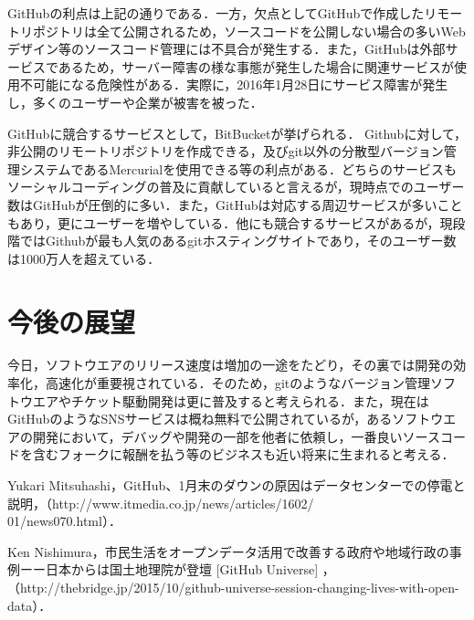 \documentclass[a4paper,9pt,twocolumn]{jsarticle}
\begin{document}
GitHubの利点は上記の通りである．一方，欠点としてGitHubで作成したリモートリポジトリは全て公開されるため，ソースコードを公開しない場合の多いWebデザイン等のソースコード管理には不具合が発生する．また，GitHubは外部サービスであるため，サーバー障害の様な事態が発生した場合に関連サービスが使用不可能になる危険性がある．実際に，2016年1月28日にサービス障害が発生し，多くのユーザーや企業が被害を被った\cite{news}．

GitHubに競合するサービスとして，BitBucketが挙げられる． Githubに対して，非公開のリモートリポジトリを作成できる，及びgit以外の分散型バージョン管理システムであるMercurialを使用できる等の利点がある．どちらのサービスもソーシャルコーディングの普及に貢献していると言えるが，現時点でのユーザー数はGitHubが圧倒的に多い．また，GitHubは対応する周辺サービスが多いこともあり，更にユーザーを増やしている．他にも競合するサービスがあるが，現段階ではGithubが最も人気のあるgitホスティングサイトであり，そのユーザー数は1000万人を超えている\cite{github}．

\section{今後の展望}
今日，ソフトウエアのリリース速度は増加の一途をたどり，その裏では開発の効率化，高速化が重要視されている．そのため，gitのようなバージョン管理ソフトウエアやチケット駆動開発は更に普及すると考えられる．また，現在はGitHubのようなSNSサービスは概ね無料で公開されているが，あるソフトウエアの開発において，デバッグや開発の一部を他者に依頼し，一番良いソースコードを含むフォークに報酬を払う等のビジネスも近い将来に生まれると考える．

\small
\begin{thebibliography}{99}
Yukari Mitsuhashi，GitHub、1月末のダウンの原因はデータセンターでの停電と説明，（http://www.itmedia.co.jp/news/articles/1602/\\01/news070.html）．

Ken Nishimura，市民生活をオープンデータ活用で改善する政府や地域行政の事例ーー日本からは国土地理院が登壇 [GitHub Universe]
，（http://thebridge.jp/2015/10/github-universe-session-changing-lives-with-open-data）．
\end{thebibliography}
\end{document}
